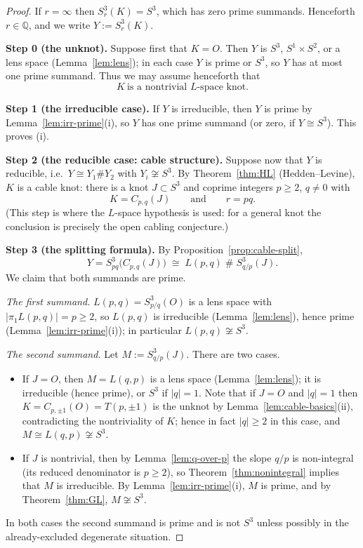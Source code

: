\documentclass[11pt]{article}
\theoremstyle{definition}
\theoremstyle{remark}
\numberwithin{equation}{section}
\begin{document}
\begin{proof}
If $r=\infty$ then $S^{3}_{r}(K)=S^{3}$, which has zero prime summands.
Henceforth $r\in\mathbb{Q}$, and we write
$Y:=S^{3}_{r}(K)$.

\medskip
\noindent\textbf{Step 0 (the unknot).}
Suppose first that $K=O$.  Then $Y$ is $S^{3}$, $S^{1}\times S^{2}$, or a
lens space (Lemma~\ref{lem:lens}); in each case $Y$ is prime or $S^{3}$,
so $Y$ has at most one prime summand.  Thus we may assume henceforth
that
\[
K\ \text{is a nontrivial } L\text{-space knot.}
\]

\medskip
\noindent\textbf{Step 1 (the irreducible case).}
If $Y$ is irreducible, then $Y$ is prime by
Lemma~\ref{lem:irr-prime}(i), so $Y$ has one prime summand (or zero, if
$Y\cong S^{3}$).  This proves (i).

\medskip
\noindent\textbf{Step 2 (the reducible case: cable structure).}
Suppose now that $Y$ is reducible, i.e.\ $Y\cong Y_{1}\#Y_{2}$ with
$Y_{i}\not\cong S^{3}$.  By Theorem~\ref{thm:HL} (Hedden--Levine), $K$
is a cable knot: there is a knot $J\subset S^{3}$ and coprime integers
$p\ge2$, $q\neq0$ with
\[
K=C_{p,q}(J)
\qquad\text{and}\qquad
r=pq .
\]
(This step is where the $L$-space hypothesis is used: for a general knot
the conclusion is precisely the open cabling conjecture.)

\medskip
\noindent\textbf{Step 3 (the splitting formula).}
By Proposition~\ref{prop:cable-split},
\[
Y=S^{3}_{pq}\bigl(C_{p,q}(J)\bigr)\;\cong\;
L(p,q)\;\#\;S^{3}_{q/p}(J).
\]
We claim that both summands are prime.

\emph{The first summand.}  $L(p,q)=S^{3}_{p/q}(O)$ is a lens space with
$|\pi_{1}L(p,q)|=p\ge2$, so $L(p,q)$ is irreducible
(Lemma~\ref{lem:lens}), hence prime
(Lemma~\ref{lem:irr-prime}(i)); in particular
$L(p,q)\not\cong S^{3}$.

\emph{The second summand.}  Let $M:=S^{3}_{q/p}(J)$.  There are two
cases.
\begin{itemize}
\item If $J=O$, then $M=L(q,p)$ is a lens space
(Lemma~\ref{lem:lens}); it is irreducible (hence prime), or $S^{3}$ if
$|q|=1$.  Note that if $J=O$ and $|q|=1$ then
$K=C_{p,\pm1}(O)=T(p,\pm1)$ is the unknot by
Lemma~\ref{lem:cable-basics}(ii), contradicting the nontriviality of
$K$; hence in fact $|q|\ge2$ in this case, and $M\cong L(q,p)\not\cong
S^{3}$.
\item If $J$ is nontrivial, then by Lemma~\ref{lem:q-over-p} the slope
$q/p$ is non-integral (its reduced denominator is $p\ge2$), so
Theorem~\ref{thm:nonintegral} implies that $M$ is irreducible.  By
Lemma~\ref{lem:irr-prime}(i), $M$ is prime, and by
Theorem~\ref{thm:GL}, $M\not\cong S^{3}$.
\end{itemize}
In both cases the second summand is prime and is not $S^{3}$ unless
possibly in the already-excluded degenerate situation.


\end{proof}
\end{document}

